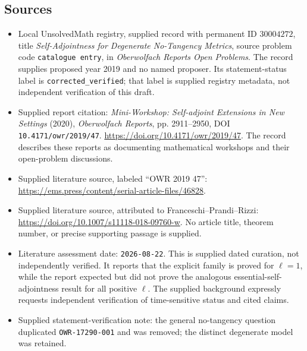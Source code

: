 \documentclass[11pt]{article}
\begin{document}
\subsection{Sources}
\begin{itemize}
\item Local UnsolvedMath registry, supplied record with permanent ID \(30004272\), title \emph{Self-Adjointness for Degenerate No-Tangency Metrics}, source problem code \texttt{catalogue entry}, in \emph{Oberwolfach Reports Open Problems}. The record supplies proposed year 2019 and no named proposer. Its statement-status label is \texttt{corrected\_verified}; that label is supplied registry metadata, not independent verification of this draft.
\item Supplied report citation: \emph{Mini-Workshop: Self-adjoint Extensions in New Settings} (2020), \emph{Oberwolfach Reports}, pp. 2911--2950, DOI \texttt{10.4171/owr/2019/47}. \url{https://doi.org/10.4171/owr/2019/47}. The record describes these reports as documenting mathematical workshops and their open-problem discussions.
\item Supplied literature source, labeled ``OWR 2019 47'': \url{https://ems.press/content/serial-article-files/46828}.
\item Supplied literature source, attributed to Franceschi--Prandi--Rizzi: \url{https://doi.org/10.1007/s11118-018-09760-w}. No article title, theorem number, or precise supporting passage is supplied.
\item Literature assessment date: \texttt{2026-08-22}. This is supplied dated curation, not independently verified. It reports that the explicit family is proved for \(\ell=1\), while the report expected but did not prove the analogous essential-self-adjointness result for all positive \(\ell\). The supplied background expressly requests independent verification of time-sensitive status and cited claims.
\item Supplied statement-verification note: the general no-tangency question duplicated \texttt{OWR-17290-001} and was removed; the distinct degenerate model was retained.
\end{itemize}
\end{document}

